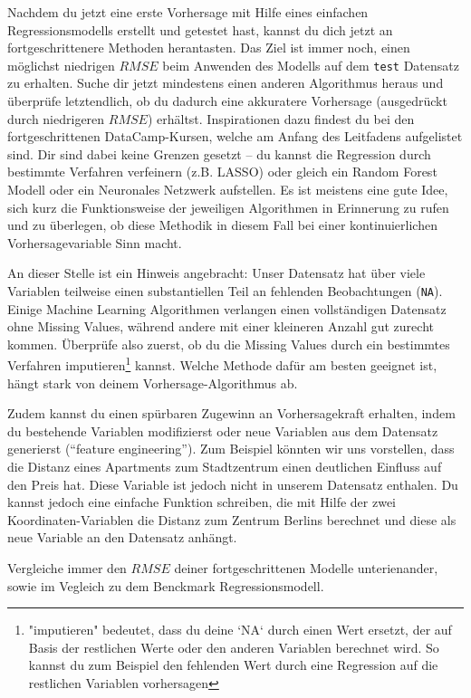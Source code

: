 \documentclass[
]{book}
\begin{document}
Nachdem du jetzt eine erste Vorhersage mit Hilfe eines einfachen Regressionsmodells erstellt und getestet hast, kannst du dich jetzt an fortgeschrittenere Methoden herantasten.
Das Ziel ist immer noch, einen möglichst niedrigen \(RMSE\) beim Anwenden des Modells auf dem \texttt{test} Datensatz zu erhalten.
Suche dir jetzt mindestens einen anderen Algorithmus heraus und überprüfe letztendlich, ob du dadurch eine akkuratere Vorhersage (ausgedrückt durch niedrigeren \(RMSE\)) erhältst.
Inspirationen dazu findest du bei den fortgeschrittenen DataCamp-Kursen, welche am Anfang des Leitfadens aufgelistet sind.
Dir sind dabei keine Grenzen gesetzt -- du kannst die Regression durch bestimmte Verfahren verfeinern (z.B. LASSO) oder gleich ein Random Forest Modell oder ein Neuronales Netzwerk aufstellen.
Es ist meistens eine gute Idee, sich kurz die Funktionsweise der jeweiligen Algorithmen in Erinnerung zu rufen und zu überlegen, ob diese Methodik in diesem Fall bei einer kontinuierlichen Vorhersagevariable Sinn macht.

An dieser Stelle ist ein Hinweis angebracht: Unser Datensatz hat über viele Variablen teilweise einen substantiellen Teil an fehlenden Beobachtungen (\texttt{NA}).
Einige Machine Learning Algorithmen verlangen einen vollständigen Datensatz ohne Missing Values, während andere mit einer kleineren Anzahl gut zurecht kommen.
Überprüfe also zuerst, ob du die Missing Values durch ein bestimmtes Verfahren imputieren\footnote{"imputieren" bedeutet, dass du deine `NA` durch einen Wert ersetzt, der auf Basis der restlichen Werte oder den anderen Variablen berechnet wird. So kannst du zum Beispiel den fehlenden Wert durch eine Regression auf die restlichen Variablen vorhersagen} kannst.
Welche Methode dafür am besten geeignet ist, hängt stark von deinem Vorhersage-Algorithmus ab.

Zudem kannst du einen spürbaren Zugewinn an Vorhersagekraft erhalten, indem du bestehende Variablen modifizierst oder neue Variablen aus dem Datensatz generierst (``feature engineering'').
Zum Beispiel könnten wir uns vorstellen, dass die Distanz eines Apartments zum Stadtzentrum einen deutlichen Einfluss auf den Preis hat.
Diese Variable ist jedoch nicht in unserem Datensatz enthalen.
Du kannst jedoch eine einfache Funktion schreiben, die mit Hilfe der zwei Koordinaten-Variablen die Distanz zum Zentrum Berlins berechnet und diese als neue Variable an den Datensatz anhängt.

Vergleiche immer den \(RMSE\) deiner fortgeschrittenen Modelle unterienander, sowie im Vegleich zu dem Benckmark Regressionsmodell.
\end{document}
